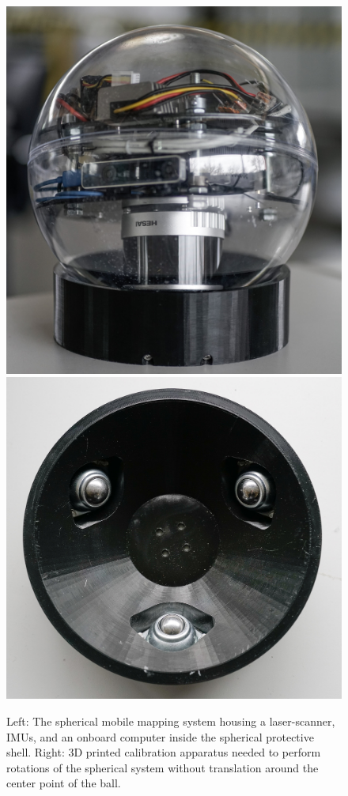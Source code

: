 \begin{figure}
  \centering
  \vskip 3mm
  \includegraphics[height=.17\textheight]{img/sphere_calib}
  \includegraphics[height=.17\textheight]{img/calib_station}
  \caption{Left: The spherical mobile mapping system housing a laser-scanner, IMUs, and an onboard computer inside the spherical protective shell.
  Right: 3D printed calibration apparatus needed to perform rotations of the spherical system without translation around the center point of the ball.}
  \label{fig:calibstation}
\end{figure}

